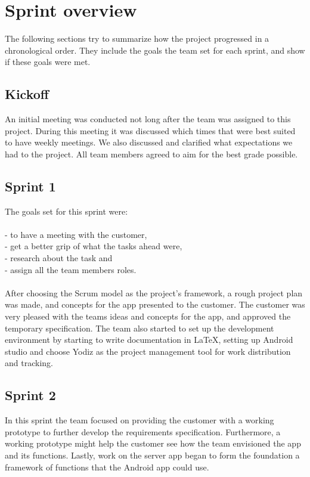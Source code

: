 \section{Sprint overview}
The following sections try to summarize how the project progressed in a chronological order. They include the goals the team set for each sprint, and show if these goals were met.

\subsection{Kickoff}
An initial meeting was conducted not long after the team was assigned to this project. During this meeting it was discussed which times that were best suited to have weekly meetings. We also discussed and clarified what expectations we had to the project. All team members agreed to aim for the best grade possible.

\subsection{Sprint 1}
The goals set for this sprint were:\\\\
- to have a meeting with the customer,\\
- get a better grip of what the tasks ahead were,\\
- research about the task and \\
- assign all the team members roles.\\\\
After choosing the Scrum model as the project's framework, a rough project plan was made, and concepts for the app presented to the customer. The customer was very pleased with the teams ideas and concepts for the app, and approved the temporary specification. The team also started to set up the development environment by starting to write documentation in \LaTeX, setting up Android studio and choose Yodiz as the project management tool for work distribution and tracking.

\subsection{Sprint 2}
In this sprint the team focused on providing the customer with a working
prototype to further develop the requirements specification. Furthermore, a
working prototype might help the customer see how the team envisioned the app
and its functions. Lastly, work on the server app began to form the
foundation a framework of functions that the Android app could use.

